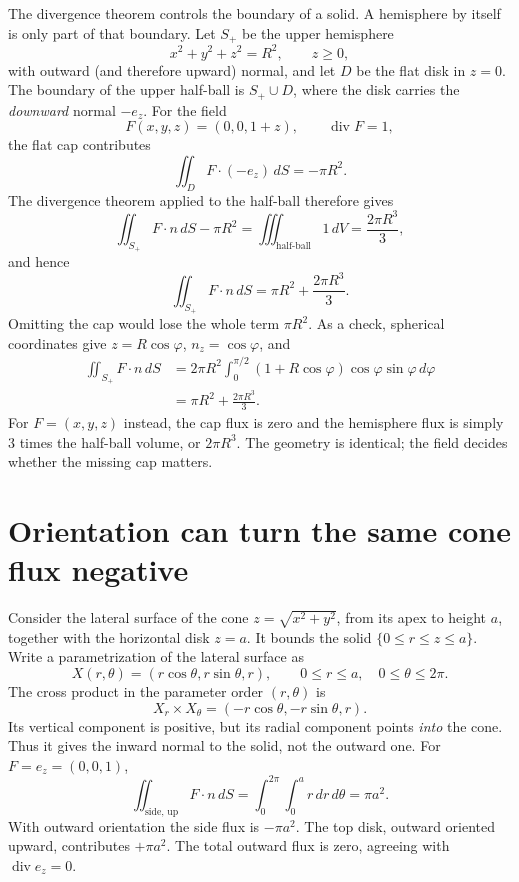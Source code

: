 The divergence theorem controls the boundary of a solid. A hemisphere by itself is only part of that boundary. Let $S_+$ be the upper hemisphere
\[
 x^2+y^2+z^2=R^2,\qquad z\ge0,
\]
with outward (and therefore upward) normal, and let $D$ be the flat disk in $z=0$. The boundary of the upper half-ball is $S_+\cup D$, where the disk carries the \emph{downward} normal $-e_z$. For the field
\[
 F(x,y,z)=(0,0,1+z),\qquad \operatorname{div}F=1,
\]
the flat cap contributes
\[
 \iint_D F\cdot(-e_z)\,dS=-\pi R^2.
\]
The divergence theorem applied to the half-ball therefore gives
\[
 \iint_{S_+}F\cdot n\,dS-\pi R^2
 =\iiint_{\text{half-ball}}1\,dV
 =\frac{2\pi R^3}{3},
\]
and hence
\[
 \boxed{\iint_{S_+}F\cdot n\,dS
 =\pi R^2+\frac{2\pi R^3}{3}.}
\]
Omitting the cap would lose the whole term $\pi R^2$. As a check, spherical coordinates give $z=R\cos\varphi$, $n_z=\cos\varphi$, and
\[
 \begin{aligned}
 \iint_{S_+}F\cdot n\,dS
 &=2\pi R^2\int_0^{\pi/2}
    (1+R\cos\varphi)\cos\varphi\sin\varphi\,d\varphi\\
 &=\pi R^2+\frac{2\pi R^3}{3}.
 \end{aligned}
\]
For $F=(x,y,z)$ instead, the cap flux is zero and the hemisphere flux is simply $3$ times the half-ball volume, or $2\pi R^3$. The geometry is identical; the field decides whether the missing cap matters.

\section{Orientation can turn the same cone flux negative}

Consider the lateral surface of the cone $z=\sqrt{x^2+y^2}$, from its apex to height $a$, together with the horizontal disk $z=a$. It bounds the solid $\{0\le r\le z\le a\}$. Write a parametrization of the lateral surface as
\[
 X(r,\theta)=(r\cos\theta,r\sin\theta,r),
 \qquad0\le r\le a,\quad0\le\theta\le2\pi.
\]
The cross product in the parameter order $(r,\theta)$ is
\[
 X_r\times X_\theta
 =(-r\cos\theta,-r\sin\theta,r).
\]
Its vertical component is positive, but its radial component points \emph{into} the cone. Thus it gives the inward normal to the solid, not the outward one. For $F=e_z=(0,0,1)$,
\[
 \iint_{\text{side},\,\mathrm{up}}F\cdot n\,dS
 =\int_0^{2\pi}\int_0^a r\,dr\,d\theta
 =\pi a^2.
\]
With outward orientation the side flux is $-\pi a^2$. The top disk, outward oriented upward, contributes $+\pi a^2$. The total outward flux is zero, agreeing with $\operatorname{div}e_z=0$.

